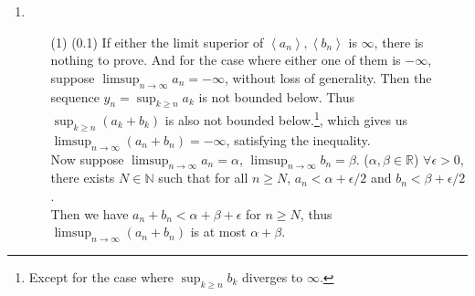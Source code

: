 \documentclass[12pt]{report}
\newcommand{\numl}[1]{\item[\large\textbf{\sffamily #1.}]}
\newcommand{\bb}[1]{\mathbb{#1}}
\renewcommand{\span}[1]{\left\langle #1 \right\rangle}
\newcommand{\ds}{\displaystyle}
\begin{document}
\begin{enumerate}
\numl{4}
\begin{enumerate}
	\item[(1)] (0.1) If either the limit superior of $\span{a_n}, \span{b_n}$ is $\infty$, there is nothing to prove. And for the case where either one of them is $-\infty$, suppose $\ds\limsup_{n\rightarrow \infty}a_n=-\infty$, without loss of generality. Then the sequence $y_n=\sup_{k\geq n}a_k$ is not bounded below. Thus $\sup_{k\geq n}(a_k+b_k)$ is also not bounded below.\footnote{Except for the case where $\sup_{k\geq n}b_k$ diverges to $\infty$.}, which gives us $\ds \limsup_{n\rightarrow \infty}(a_n+b_n) = -\infty$, satisfying the inequality.\\
	Now suppose $\ds\limsup_{n\rightarrow \infty}a_n = \alpha$, $\ds \limsup_{n\rightarrow \infty} b_n = \beta$. ($\alpha, \beta \in \bb{R}$) $\forall \epsilon > 0$, there exists $N\in \bb{N}$ such that for all $n\geq N$, $a_n < \alpha + \epsilon/2$ and $b_n < \beta + \epsilon /2$. \\Then we have $a_n+b_n < \alpha + \beta + \epsilon$ for $n\geq N$, thus $\ds\limsup_{n\rightarrow \infty}(a_n+b_n)$ is at most $\alpha+\beta$.\\


\end{enumerate}
\end{enumerate}
\end{document}
